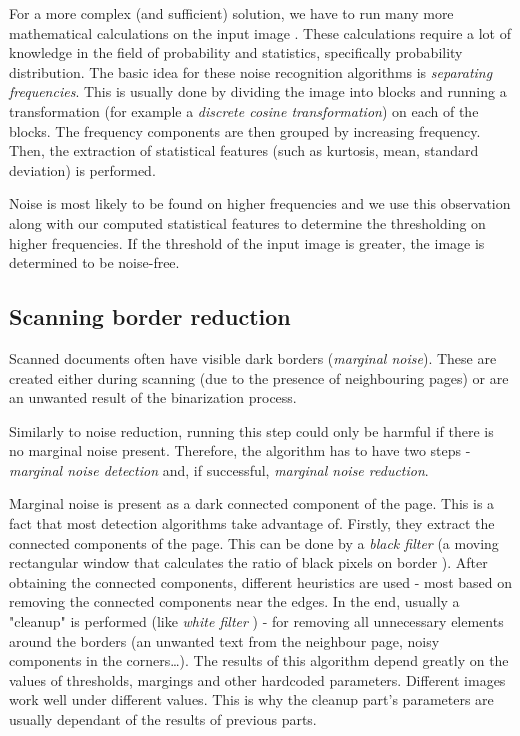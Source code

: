 For a more complex (and sufficient) solution, we have to run many more mathematical calculations on the input image \citep{noiseDetection}. These calculations require a lot of knowledge in the field of probability and statistics, specifically probability distribution. The basic idea for these noise recognition algorithms is \emph{separating frequencies}. This is usually done by dividing the image into blocks and running a transformation (for example a \emph{discrete cosine transformation}) on each of the blocks. The frequency components are then grouped by increasing frequency. Then, the extraction of statistical features (such as kurtosis, mean, standard deviation) is performed.

Noise is most likely to be found on higher frequencies and we use this observation along with our computed statistical features to determine the thresholding on higher frequencies. If the threshold of the input image is greater, the image is determined to be noise-free. 

\subsection{Scanning border reduction}

Scanned documents often have visible dark borders (\emph{marginal noise}). These are created either during scanning (due to the presence of neighbouring pages) or are an unwanted result of the binarization process.

Similarly to noise reduction, running this step could only be harmful if there is no marginal noise present. Therefore, the algorithm has to have two steps - \emph{marginal noise detection} and, if successful, \emph{marginal noise reduction}.

Marginal noise is present as a dark connected component of the page. This is a fact that most detection algorithms take advantage of. Firstly, they extract the connected components of the page. This can be done by a \emph{black filter} (a moving rectangular window that calculates the ratio of black pixels on border \citep{marginalNoiseWindow}). After obtaining the connected components, different heuristics are used - most based on removing the connected components near the edges. In the end, usually a "cleanup" is performed (like \emph{white filter} \citep{marginalNoiseWindow}) - for removing all unnecessary elements around the borders (an unwanted text from the neighbour page, noisy components in the corners\ldots).
The results of this algorithm depend greatly on the values of thresholds, margings and other hardcoded parameters. Different images work well under different values. This is why the cleanup part's parameters are usually dependant of the results of previous parts.

